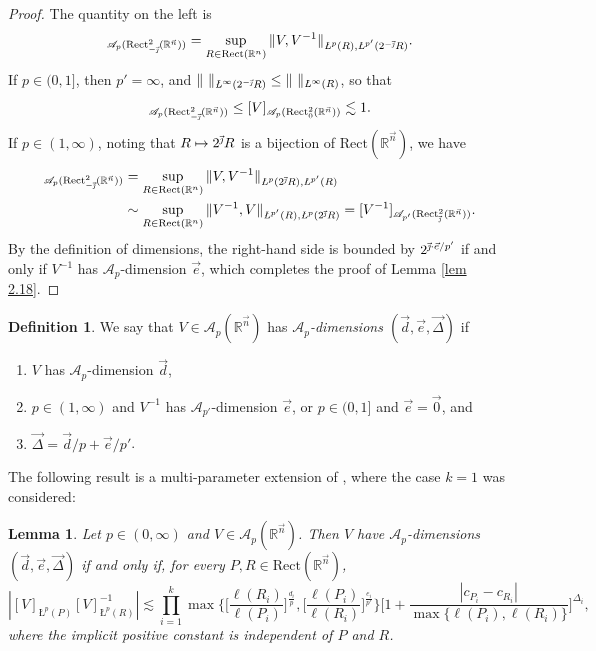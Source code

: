 \documentclass[11pt, reqno]{amsart}
\newtheorem{lemma}[theorem]{Lemma}
\theoremstyle{definition}
\newtheorem{definition}[theorem]{Definition}
\theoremstyle{remark}
\numberwithin{equation}{section}
\newcommand{\A}{\mathscr A}
\newcommand{\R}{\mathbb R}
\newcommand{\vnull}{\vec 0}
\newcommand{\vd}{\vec d}
\newcommand{\vDe}{\vec{\Delta}}
\newcommand{\ve}{\vec e}
\newcommand{\vj}{\vec{\textit{\j}}}
\newcommand{\vn}{\vec n}
\newcommand{\aveL}{\textit{\L}}
\newcommand{\abs}[1]{|#1|}
\newcommand{\Norm}[2]{\|#1\|_{#2}}
\newcommand{\Rect}{\mathrm{Rect}}
\begin{document}
\begin{proof}
The quantity on the left is
\begin{equation*}
[V]_{\A_p(\Rect^2_{-\vj}(\R^{\vn}))}=\sup_{R\in\Rect(\R^n)}\Norm{V,V^{-1}}{\aveL^p(R),
\aveL^{p'}(2^{-\vj}R)}.
\end{equation*}
If $p\in(0,1]$, then $p'=\infty$, and $\Norm{\ }{\aveL^\infty(2^{-\vj}R)}\leq\Norm{\ }{\aveL^\infty(R)}$, so that
\begin{equation*}
[V]_{\A_p(\Rect^2_{-\vj}(\R^{\vn}))}
\leq[V]_{\A_p(\Rect^2_{0}(\R^{\vn}))}\lesssim 1.
\end{equation*}
If $p\in(1,\infty)$, noting that $R\mapsto 2^{\vj}R$ is a bijection of $\Rect(\R^{\vn})$, we have
\begin{align*}
[V]_{\A_p(\Rect^2_{-\vj}(\R^{\vn}))}
&=\sup_{R\in\Rect(\R^n)}\Norm{V,V^{-1}}{\aveL^p(2^{\vj}R),\aveL^{p'}(R)} \\
&\sim\sup_{R\in\Rect(\R^n)}\Norm{V^{-1},V}{\aveL^{p'}(R),\aveL^p(2^{\vj}R)}
=[V^{-1}]_{\A_{p'}(\Rect^2_{\vj}(\R^{\vn}))}.
\end{align*}
By the definition of dimensions, the right-hand side is bounded by $2^{\vj\cdot\ve/p'}$ if and only if $V^{-1}$ has $\A_p$-dimension $\ve$,
which completes the proof of Lemma \ref{lem 2.18}.
\end{proof}

\begin{definition}\label{def Ap dim}
We say that $V\in\A_p(\R^{\vn})$ has \emph{$\A_p$-dimensions $(\vd,\ve,\vDe)$} if
\begin{enumerate}[\rm(1)]
\item $V$ has $\A_p$-dimension $\vd$,
\item $p\in(1,\infty)$ and $V^{-1}$ has $\A_{p'}$-dimension $\ve$, or $p\in(0,1]$ and $\ve=\vnull$, and
\item $\vDe=\vd/p+\ve/p'$.
\end{enumerate}
\end{definition}

The following result is a multi-parameter extension of \cite[Lemma 2.28]{BHYY:1a}, where the case $k=1$ was considered:

\begin{lemma}\label{sharp coef}
Let $p\in(0,\infty)$ and $V\in\A_{p}(\R^{\vn})$.
Then $V$ have $\A_p$-dimensions $(\vd,\ve,\vDe)$
if and only if, for every $P,R\in \Rect(\R^{\vn})$,
\begin{equation*}
\abs{[V]_{\aveL^{p}(P)}[V]_{\aveL^{p}(R)}^{-1}}
\lesssim
\prod_{i=1}^k\max \bigg\{\bigg[\frac{\ell(R_i)}{\ell(P_i)}\bigg]^{\frac{d_i}{p}},
\bigg[\frac{\ell(P_i)}{\ell(R_i)}\bigg]^{\frac{e_i}{p'}}\bigg\}
\bigg[ 1+\frac{\abs{c_{P_i}-c_{R_i}}}{\max\{\ell(P_i),\ell(R_i)\}}\bigg]^{\Delta_i},
\end{equation*}
where the implicit positive constant is independent of $P$ and $R$.
\end{lemma}
\end{document}
